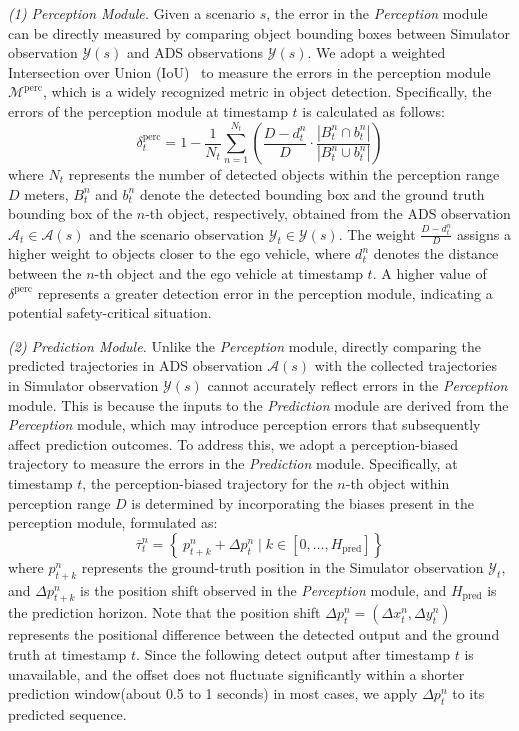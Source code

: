 \noindent \textit{(1) Perception Module.} Given a scenario $s$, the error in the \textit{Perception} module can be directly measured by comparing object bounding boxes between Simulator observation $\mathcal{Y}(s)$ and ADS observations $\mathcal{Y}(s)$.
We adopt a weighted Intersection over Union (IoU)~\cite{girshick2014rich} to measure the errors in the perception module $\mathcal{M}^{\text{perc}}$, which is a widely recognized metric in object detection.
Specifically, the errors of the perception module at timestamp $t$ is calculated as follows:
\begin{equation}
    {\delta^{\text{perc}}_{t}} = 1 - \frac{1}{N_{t}} \sum_{n=1}^{N_{t}} (\frac{D-d_t^{n}}{D} \cdot \frac{|B_t^{n} \cap b_t^n|}{|B_t^{n} \cup b_t^{n}|})
\end{equation}
where \( N_{t} \) represents the number of detected objects within the perception range \( D \) meters, \( B_{t}^{n} \) and \( b_{t}^{n} \) denote the detected bounding box and the ground truth bounding box of the \( n \)-th object, respectively, obtained from the ADS observation $\mathcal{A}_{t} \in \mathcal{A}(s)$ and the scenario observation $\mathcal{Y}_{t} \in \mathcal{Y}(s)$. 
The weight \( \frac{D-d_t^n}{D} \) assigns a higher weight to objects closer to the ego vehicle, where \( d_t^n \) denotes the distance between the \( n \)-th object and the ego vehicle at timestamp \( t \).
A higher value of \(\delta^{\text{perc}}\) represents a greater detection error in the perception module, indicating a potential safety-critical situation.


\noindent \textit{(2) Prediction Module.} Unlike the \textit{Perception} module, directly comparing the predicted trajectories in ADS observation \(\mathcal{A}(s)\) with the collected trajectories in Simulator observation \(\mathcal{Y}(s)\) cannot accurately reflect errors in the \textit{Perception} module. This is because the inputs to the \textit{Prediction} module are derived from the \textit{Perception} module, which may introduce perception errors that subsequently affect prediction outcomes. 
To address this, we adopt a perception-biased trajectory to measure the errors in the \textit{Prediction} module. 
Specifically, at timestamp \( t \), the perception-biased trajectory for the $n$-th object within perception range $D$ is determined by incorporating the biases present in the perception module, formulated as:
\begin{equation}
    \overline{\tau}_t^n = \left\{\ p_{t+k}^n + \Delta p_t^n \mid k \in [0, \ldots, H_{\text{pred}}] \right\}
\end{equation}
where \( p_{t+k}^n \) represents the ground-truth position in the Simulator observation \(\mathcal{Y}_t\), and \( \Delta p_{t+k}^n \) is the position shift observed in the \textit{Perception} module, and $H_\text{pred}$ is the prediction horizon. Note that the position shift \(\Delta p_t^n = (\Delta x_t^n, \Delta y_t^n)\) represents the positional difference between the detected output and the ground truth at timestamp $t$. Since the following detect output after timestamp $t$ is unavailable, and the offset does not fluctuate significantly within a shorter prediction window(about 0.5 to 1 seconds) in most cases, we apply $\Delta p_t^n$ to its predicted sequence.

